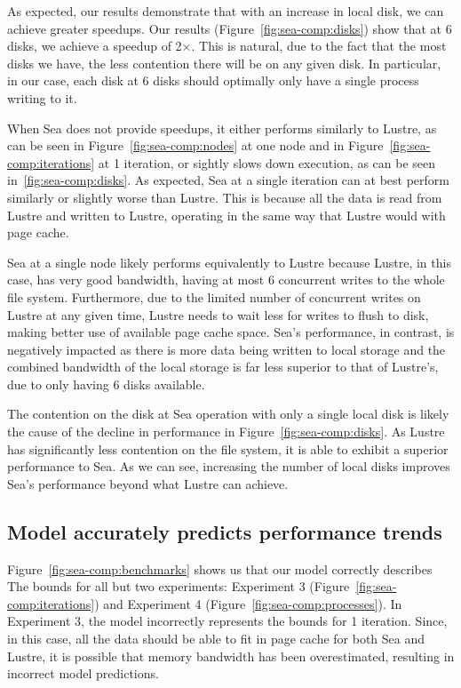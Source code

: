 \documentclass[10pt,journal,compsoc]{IEEEtran}
\begin{document}
      As expected, our results demonstrate that with an increase in local disk,
      we can achieve greater speedups. Our results
      (Figure~\ref{fig:sea-comp:disks}) show that at 6 disks, we achieve a
      speedup of 2$\times$. This is natural, due to the fact that the most disks
      we have, the less contention there will be on any given disk. In
      particular, in our case, each disk at 6 disks should optimally only have a
      single process writing to it.

      When Sea does not provide speedups, it either performs similarly to
      Lustre, as can be seen in Figure~\ref{fig:sea-comp:nodes} at one node and
      in Figure~\ref{fig:sea-comp:iterations} at 1 iteration, or sightly slows
      down execution, as can be seen in~\ref{fig:sea-comp:disks}. As expected,
      Sea at a single iteration can at best perform similarly or slightly worse
      than Lustre. This is because all the data is read from Lustre and written
      to Lustre, operating in the same way that Lustre would with page cache.

      Sea at a single node likely performs equivalently to Lustre because
      Lustre, in this case, has very good bandwidth, having at most 6 concurrent
      writes to the whole file system. Furthermore, due to the limited number of
      concurrent writes on Lustre at any given time, Lustre needs to wait less
      for writes to flush to disk, making better use of available page cache
      space. Sea's performance, in contrast, is negatively impacted as there is
      more data being written to local storage and the combined bandwidth of the
      local storage is far less superior to that of Lustre's, due to only having
      6 disks available.

      The contention on the disk at Sea operation with only a single local disk
      is likely the cause of the decline in performance in
      Figure~\ref{fig:sea-comp:disks}. As Lustre has significantly less
      contention on the file system, it is able to exhibit a superior
      performance to Sea. As we can see, increasing the number of local disks
      improves Sea's performance beyond what Lustre can achieve.
    

      \subsection{Model accurately predicts performance trends}

      Figure~\ref{fig:sea-comp:benchmarks} shows us that our model correctly
      describes The bounds for all but two experiments: Experiment 3
      (Figure~\ref{fig:sea-comp:iterations}) and Experiment 4
      (Figure~\ref{fig:sea-comp:processes}). In Experiment 3, the model
      incorrectly represents the bounds for 1 iteration. Since, in this case,
      all the data should be able to fit in page cache for both Sea and Lustre,
      it is possible that memory bandwidth has been overestimated, resulting in
      incorrect model predictions.
\end{document}
